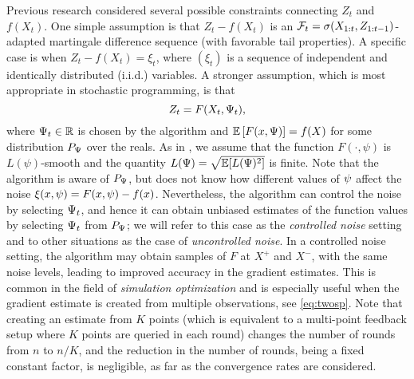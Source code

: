 Previous research considered several possible constraints connecting $Z_t$ and $f(X_t)$.
One simple assumption is that $Z_t-f(X_t)$ is an $\mathcal{F}_t = \sigma(X_{1:t},Z_{1:t-1})$-adapted martingale difference sequence (with favorable tail properties).
A specific case is when $Z_t - f(X_t) = \xi_t$, where $(\xi_t)$ is a sequence of independent and identically distributed (i.i.d.) variables.
A stronger assumption, which is most appropriate in stochastic programming,
is that 
\begin{equation}
\label{eq:controlled}
Z_t = F(X_t,\Psi_t),
\end{equation} where $\Psi_t\in \mathbb{R}$ is chosen by the algorithm and $\mathbb{E}\left[F(x,\Psi)\right]=f(X)$ for some distribution $P_{\Psi}$ over the reals. As in \cite{duchi2015optimal}, we assume that the function $F(\cdot, \psi)$ is $L(\psi)$-smooth and the quantity $L(\Psi) = \sqrt{\mathbb{E} [L(\Psi)^2]}$ is finite.  
Note that the algorithm is aware of $P_{\Psi}$, but does not know how different values of $\psi$ affect the noise $\xi(x,\psi)=F(x,\psi)-f(x)$. Nevertheless, the algorithm can control the noise by selecting $\Psi_t$, and hence it can obtain unbiased estimates of the function values by selecting $\Psi_t$ from $P_{\Psi}$; we will refer to this case as the \emph{controlled noise} setting and to other situations as the case of \emph{uncontrolled noise}. 
In a controlled noise setting, the algorithm may obtain samples of $F$ at $X^+$ and $X^-$, with the same noise levels, leading to improved accuracy in the gradient estimates. This is common in the field of \emph{simulation optimization}
\citep{KlSpNa99,duchi2015optimal} and is especially useful when the gradient estimate is created from multiple observations, see \eqref{eq:twosp}. Note that creating an estimate from $K$ points (which is equivalent to a multi-point feedback setup where $K$ points are queried in each round) changes the number of rounds from $n$ to $n/K$, and  the reduction in the number of rounds, being a fixed constant factor, is negligible, as far as the convergence rates are considered.


%
%


